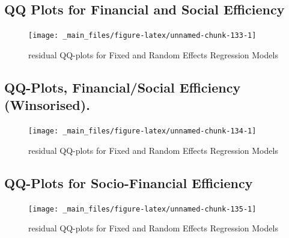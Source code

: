 \documentclass[a4paper, nobind]{templates/ociamthesis}
\begin{document}
\begin{landscape}
\end{landscape}

\begin{landscape}

\newpage

\hypertarget{qq-plots-for-financial-and-social-efficiency}{%
\subsection{QQ Plots for Financial and Social Efficiency}\label{qq-plots-for-financial-and-social-efficiency}}

\begin{figure}

{\centering \texttt{[image: \_main\_files/figure-latex/unnamed-chunk-133-1]} 

}

\caption{residual QQ-plots for Fixed and Random Effects Regression Models}\label{fig:unnamed-chunk-133}
\end{figure}

\newpage

\hypertarget{qq-plots-financialsocial-efficiency-winsorised.}{%
\subsection{QQ-Plots, Financial/Social Efficiency (Winsorised).}\label{qq-plots-financialsocial-efficiency-winsorised.}}

\begin{figure}

{\centering \texttt{[image: \_main\_files/figure-latex/unnamed-chunk-134-1]} 

}

\caption{residual QQ-plots for Fixed and Random Effects Regression Models}\label{fig:unnamed-chunk-134}
\end{figure}

\newpage

\hypertarget{qq-plots-for-socio-financial-efficiency}{%
\subsection{QQ-Plots for Socio-Financial Efficiency}\label{qq-plots-for-socio-financial-efficiency}}

\begin{figure}

{\centering \texttt{[image: \_main\_files/figure-latex/unnamed-chunk-135-1]} 

}

\caption{residual QQ-plots for Fixed and Random Effects Regression Models}\label{fig:unnamed-chunk-135}
\end{figure}

\end{landscape}
\end{document}
